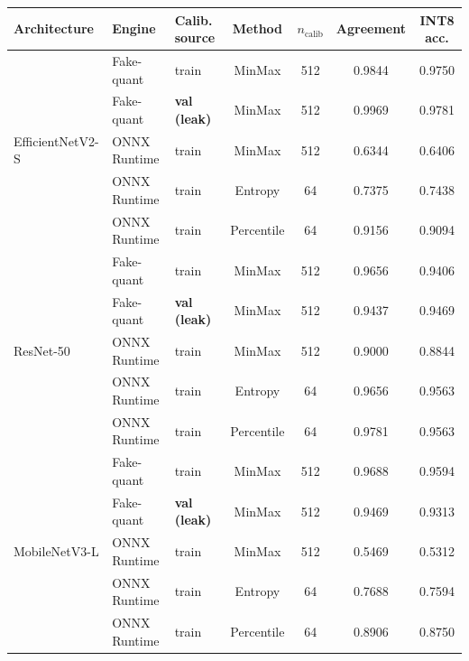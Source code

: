 \begin{tabular}{ll l cc cc}
\toprule
\textbf{Architecture} & \textbf{Engine} & \textbf{Calib. source} & \textbf{Method} & \textbf{$n_{\text{calib}}$} & \textbf{Agreement} & \textbf{INT8 acc.} \\
\midrule
\multirow{5}{*}{EfficientNetV2-S}
 & Fake-quant & train & MinMax & 512 & 0.9844 & 0.9750 \\
 & Fake-quant & \textbf{val (leak)} & MinMax & 512 & 0.9969 & 0.9781 \\
 & ONNX Runtime & train & MinMax & 512 & 0.6344 & 0.6406 \\
 & ONNX Runtime & train & Entropy & 64 & 0.7375 & 0.7438 \\
 & ONNX Runtime & train & Percentile & 64 & 0.9156 & 0.9094 \\
\midrule
\multirow{5}{*}{ResNet-50}
 & Fake-quant & train & MinMax & 512 & 0.9656 & 0.9406 \\
 & Fake-quant & \textbf{val (leak)} & MinMax & 512 & 0.9437 & 0.9469 \\
 & ONNX Runtime & train & MinMax & 512 & 0.9000 & 0.8844 \\
 & ONNX Runtime & train & Entropy & 64 & 0.9656 & 0.9563 \\
 & ONNX Runtime & train & Percentile & 64 & 0.9781 & 0.9563 \\
\midrule
\multirow{5}{*}{MobileNetV3-L}
 & Fake-quant & train & MinMax & 512 & 0.9688 & 0.9594 \\
 & Fake-quant & \textbf{val (leak)} & MinMax & 512 & 0.9469 & 0.9313 \\
 & ONNX Runtime & train & MinMax & 512 & 0.5469 & 0.5312 \\
 & ONNX Runtime & train & Entropy & 64 & 0.7688 & 0.7594 \\
 & ONNX Runtime & train & Percentile & 64 & 0.8906 & 0.8750 \\
\bottomrule
\end{tabular}
